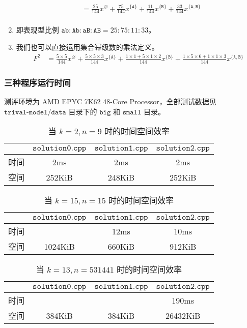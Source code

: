 \documentclass[12pt]{article} %
\begin{document}
\begin{enumerate}
$$\begin{aligned}
			  &= \frac{25}{144} x^{\varnothing} + \frac{75}{144} x^{\{\texttt{A}\}} + \frac{11}{144} x^{\{\texttt{B}\}} + \frac{33}{144} x^{\{\texttt{A},\texttt{B}\}} \\
		\end{aligned}
		$$
	\item 即表现型比例 $\texttt{ab} : \texttt{Ab} : \texttt{aB} : \texttt{AB}=25:75:11:33$。
	\item 我们也可以直接运用集合幂级数的乘法定义。\\
		$$
		\begin{aligned}
			F^2 &= \frac{5 \times 5}{144} x^{\varnothing} + \frac{5 \times 5 \times 3}{144} x^{\{\texttt{A}\}} + \frac{1 \times 1 + 5 \times 1 \times 2}{144} x^{\{\texttt{B}\}} + \frac{1 \times 5 \times 6 + 1 \times 1 \times 3}{144} x^{\{\texttt{A},\texttt{B}\}}
		\end{aligned}
		$$
\end{enumerate}

\subsubsection*{三种程序运行时间}

测评环境为 AMD EPYC 7K62 48-Core Processor，全部测试数据见 $\texttt{trival-model/data}$ 目录下的 $\texttt{big}$ 和 $\texttt{small}$ 目录。

\begin{table}[htbp]
	\centering
	\caption{当 $k=2,n=9$ 时的时间空间效率}
	\begin{tabular}{c|c|c|c}
		& $\texttt{solution0.cpp}$ & $\texttt{solution1.cpp}$ & $\texttt{solution2.cpp}$ \\ \hline
		时间 & 2ms & 2ms & 2ms \\ \hline
		空间 & 252KiB & 248KiB & 252KiB
	\end{tabular}
\end{table}

\begin{table}[htbp]
	\centering
	\caption{当 $k=15,n=15$ 时的时间空间效率}
	\begin{tabular}{c|c|c|c}
		& $\texttt{solution0.cpp}$ & $\texttt{solution1.cpp}$ & $\texttt{solution2.cpp}$ \\ \hline
		时间 & \color{red}{>1000ms} & 12ms & 10ms \\ \hline
		空间 & 1024KiB & 660KiB & 912KiB
	\end{tabular}
\end{table}

\begin{table}[htbp]
	\centering
	\caption{当 $k=13,n=531441$ 时的时间空间效率}
	\begin{tabular}{c|c|c|c}
		& $\texttt{solution0.cpp}$ & $\texttt{solution1.cpp}$ & $\texttt{solution2.cpp}$ \\ \hline
		时间 & \color{red}{>1000ms} & \color{red}{>1000ms} & 190ms \\ \hline
		空间 & 384KiB & 384KiB & 26432KiB
	\end{tabular}
\end{table}
\end{document}
